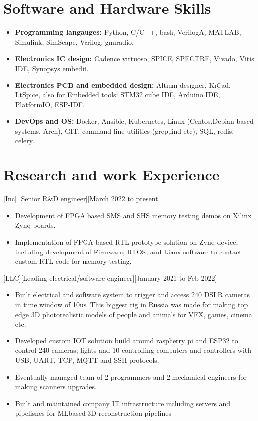 \documentclass{article}
\begin{document}
\section{Software and Hardware Skills}
\begin{itemize}
\item \textbf{Programming langauges:} Python, C/C++, bash, VerilogA, MATLAB, Simulink, SimScape, Verilog, gnuradio. 
\item \textbf{Electronics IC design:} Cadence virtuoso, SPICE, SPECTRE, Vivado, Vitis IDE, Synopsys embedit.
\item \textbf{Electronics PCB and embedded design:} Altium designer, KiCad, LtSpice, also for Embedded tools: STM32 cube IDE, Arduino IDE, PlatformIO, ESP-IDF.
\item \textbf{DevOps and OS:} Docker, Ansible, Kubernetes, Linux (Centos,Debian based systems, Arch), GIT, command line utilities (grep,find etc), SQL, redis, celery.
\end{itemize}

\section{Research and work Experience}
 

 
[Inc]
[Senior R\&D engineer][March 2022 to present]
   \begin{itemize}
      \item Development of FPGA based SMS and SHS memory testing demos on Xilinx Zynq boards.
      \item Implementation of FPGA based RTL prototype solution on Zynq device, including development of Firmware, RTOS, and Linux software to contact custom RTL code for memory testing. 
   \end{itemize}

[LLC][Leading electrical/software engineer][January 2021 to Feb 2022]
\begin{itemize}
   \item Built electrical and software system to trigger and access 240 DSLR cameras in time window of 10us. This biggest rig in Russia was made for making top edge 3D photorealistic models of people and animals for VFX, games, cinema etc.
   \item Developed custom IOT solution build around raspberry pi and ESP32 to control 240 cameras, lights and 10 controlling computers and controllers with USB, UART, TCP, MQTT and SSH protocols.
   \item Eventually managed team of 2 programmers and 2 mechanical engineers for making scanners upgrades.
   \item Built and maintained company IT infrastructure including servers and pipelisnes for MLbased 3D reconstruction pipelines.
   \end{itemize}
\end{document}
